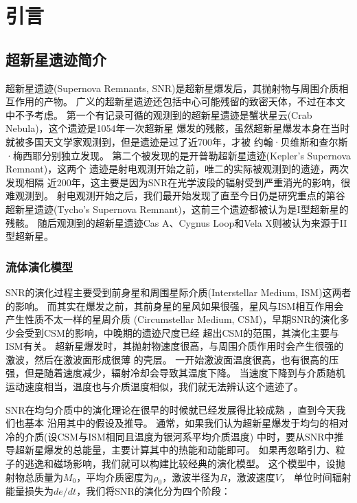 \chapter{引言}
\label{Intro}

\section{超新星遗迹简介}
\label{SNRintro}
超新星遗迹(Supernova Remnants, SNR)是超新星爆发后，其抛射物与周围介质相互作用的产物。
广义的超新星遗迹还包括中心可能残留的致密天体，不过在本文中不予考虑。
第一个有记录可循的观测到的超新星遗迹是蟹状星云(Crab Nebula)，这个遗迹是1054年一次超新星
爆发的残骸，虽然超新星爆发本身在当时就被多国天文学家观测到，但是遗迹是过了近700年，才被
约翰·贝维斯和查尔斯·梅西耶分别独立发现\citep{barrow2011cosmic}。
第二个被发现的是开普勒超新星遗迹(Kepler's Supernova Remnant)\citep{Baade1943}，这两个
遗迹是射电观测开始之前，唯二的实际被观测到的遗迹\citep{Minkowski1964}，两次发现相隔
近200年，这主要是因为SNR在光学波段的辐射受到严重消光的影响，很难观测到。
射电观测开始之后，我们最开始发现了直至今日仍是研究重点的第谷超新星遗迹(Tycho's
Supernova Remnant)，这前三个遗迹都被认为是I型超新星的残骸。
随后观测到的超新星遗迹Cas A、Cygnus Loop和Vela X则被认为来源于II型超新星。

\subsection{流体演化模型}

SNR的演化过程主要受到前身星和周围星际介质(Interstellar Medium, ISM)这两者的影响。
而其实在爆发之前，其前身星的星风如果很强，星风与ISM相互作用会产生性质不太一样的星周介质
(Circumstellar Medium, CSM)，早期SNR的演化多少会受到CSM的影响，中晚期的遗迹尺度已经
超出CSM的范围，其演化主要与ISM有关。
超新星爆发时，其抛射物速度很高，与周围介质作用时会产生很强的激波，然后在激波面形成很薄
的壳层。
一开始激波面温度很高，也有很高的压强，但是随着速度减少，辐射冷却会导致其温度下降。
当速度下降到与介质随机运动速度相当，温度也与介质温度相似，我们就无法辨认这个遗迹了。

SNR在均匀介质中的演化理论在很早的时候就已经发展得比较成熟
\citep{1959sdmm.book.....S, 1970IAUS...39..229W, Woltjer1972}，直到今天我们也基本
沿用其中的假设及推导。
通常，如果我们认为超新星爆发于均匀的相对冷的介质(设CSM与ISM相同且温度为银河系平均介质温度)
中时，要从SNR中推导超新星爆发的总能量，主要计算其中的热能和动能即可。
如果再忽略引力、粒子的逃逸和磁场影响，我们就可以构建比较经典的演化模型。
这个模型中，设抛射物总质量为$M_0$，平均介质密度为$\rho_0$，激波半径为$R$，激波速度$V$，
单位时间辐射能量损失为$de/dt$，我们将SNR的演化分为四个阶段：

